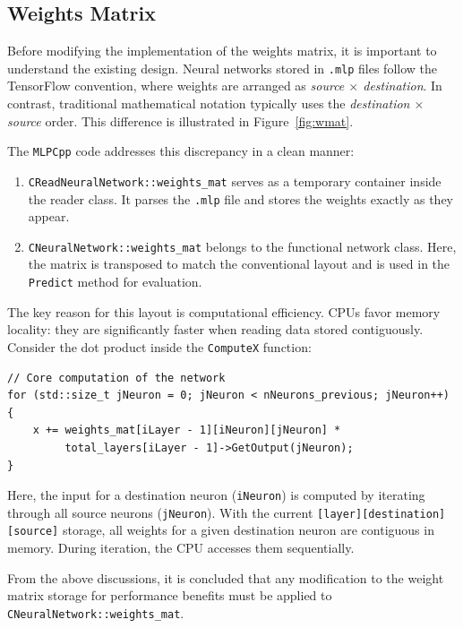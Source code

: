 \documentclass{article}
\begin{document}
\subsection{Weights Matrix}
Before modifying the implementation of the weights matrix, it is important to understand the existing design. Neural networks stored in \texttt{.mlp} files follow the TensorFlow convention, where weights are arranged as \emph{source $\times$ destination}. In contrast, traditional mathematical notation typically uses the \emph{destination $\times$ source} order. This difference is illustrated in Figure~\ref{fig:wmat}.

The \texttt{MLPCpp} code addresses this discrepancy in a clean manner:  
\begin{enumerate}
    \item \texttt{CReadNeuralNetwork::weights\_mat} serves as a temporary container inside the reader class. It parses the \texttt{.mlp} file and stores the weights exactly as they appear.
    \item \texttt{CNeuralNetwork::weights\_mat} belongs to the functional network class. Here, the matrix is transposed to match the conventional layout and is used in the \texttt{Predict} method for evaluation.
\end{enumerate}

The key reason for this layout is computational efficiency. CPUs favor memory locality: they are significantly faster when reading data stored contiguously. Consider the dot product inside the \texttt{ComputeX} function:

\begin{verbatim}
// Core computation of the network
for (std::size_t jNeuron = 0; jNeuron < nNeurons_previous; jNeuron++) {
    x += weights_mat[iLayer - 1][iNeuron][jNeuron] *
         total_layers[iLayer - 1]->GetOutput(jNeuron);
}
\end{verbatim}

Here, the input for a destination neuron (\texttt{iNeuron}) is computed by iterating through all source neurons (\texttt{jNeuron}). With the current \texttt{[layer][destination][source]} storage, all weights for a given destination neuron are contiguous in memory. During iteration, the CPU accesses them sequentially. 

From the above discussions, it is concluded that any modification to the weight matrix storage for performance benefits must be applied to \texttt{CNeuralNetwork::weights\_mat}.
\end{document}
